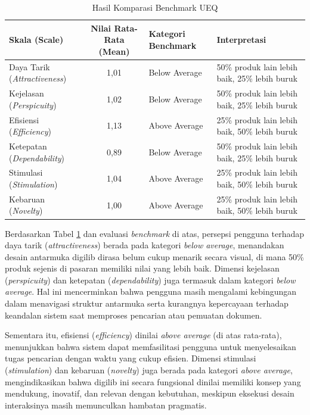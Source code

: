 \begin{table}[htbp]
\centering
\caption{Hasil Komparasi Benchmark UEQ}
\label{tab:ueq_benchmark}
\begin{tabular}{|l|c|l|p{6.0cm}|}
\hline
\textbf{Skala (Scale)} & \textbf{Nilai Rata-Rata (Mean)} & \textbf{Kategori Benchmark} & \textbf{Interpretasi} \\ \hline
Daya Tarik (\textit{Attractiveness}) & 1,01 & Below Average & 50\% produk lain lebih baik, 25\% lebih buruk \\ \hline
Kejelasan (\textit{Perspicuity}) & 1,02 & Below Average & 50\% produk lain lebih baik, 25\% lebih buruk \\ \hline
Efisiensi (\textit{Efficiency}) & 1,13 & Above Average & 25\% produk lain lebih baik, 50\% lebih buruk \\ \hline
Ketepatan (\textit{Dependability}) & 0,89 & Below Average & 50\% produk lain lebih baik, 25\% lebih buruk \\ \hline
Stimulasi (\textit{Stimulation}) & 1,04 & Above Average & 25\% produk lain lebih baik, 50\% lebih buruk \\ \hline
Kebaruan (\textit{Novelty}) & 1,00 & Above Average & 25\% produk lain lebih baik, 50\% lebih buruk \\ \hline
\end{tabular}
\end{table}

Berdasarkan Tabel \ref{tab:ueq_benchmark} dan evaluasi \textit{benchmark} di atas, persepsi pengguna terhadap daya tarik (\textit{attractiveness}) berada pada kategori \textit{below average}, menandakan desain antarmuka \gls{digilib} dirasa belum cukup menarik secara visual, di mana 50\% produk sejenis di pasaran memiliki nilai yang lebih baik. Dimensi kejelasan (\textit{perspicuity}) dan ketepatan (\textit{dependability}) juga termasuk dalam kategori \textit{below average}. Hal ini mencerminkan bahwa pengguna masih mengalami kebingungan dalam menavigasi struktur antarmuka serta kurangnya kepercayaan terhadap keandalan sistem saat memproses pencarian atau pemuatan dokumen.

Sementara itu, efisiensi (\textit{efficiency}) dinilai \textit{above average} (di atas rata-rata), menunjukkan bahwa sistem dapat memfasilitasi pengguna untuk menyelesaikan tugas pencarian dengan waktu yang cukup efisien. Dimensi stimulasi (\textit{stimulation}) dan kebaruan (\textit{novelty}) juga berada pada kategori \textit{above average}, mengindikasikan bahwa \gls{digilib} ini secara fungsional dinilai memiliki konsep yang mendukung, inovatif, dan relevan dengan kebutuhan, meskipun eksekusi desain interaksinya masih memunculkan hambatan pragmatis.

